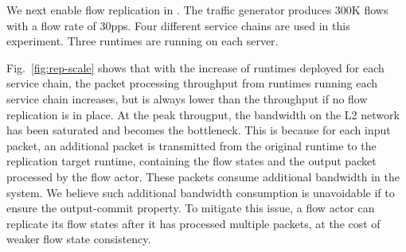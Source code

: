 


We next enable flow replication in \nfactor. The traffic generator produces 300K flows with a flow rate of 30pps.  %
Four different service chains are used in this experiment.
Three runtimes are running on each server.

Fig.~\ref{fig:rep-scale} shows that with the increase of runtimes deployed for each service chain, the packet processing throughput from runtimes running each service chain increases, but is always lower than the throughput if no flow replication is in place. %
At the peak througput, the bandwidth on the L2 network has been saturated and becomes the bottleneck. This is because for each input packet, an additional packet is transmitted from the original runtime to the replication target runtime, %
 containing the flow states and the output packet processed by the flow actor. These packets consume additional bandwidth in the system. %
 We believe such additional bandwidth consumption is unavoidable if to ensure the %
 output-commit property. To mitigate this issue, a flow actor can replicate its flow states after it has processed multiple packets, at the cost of weaker flow state consistency. %

